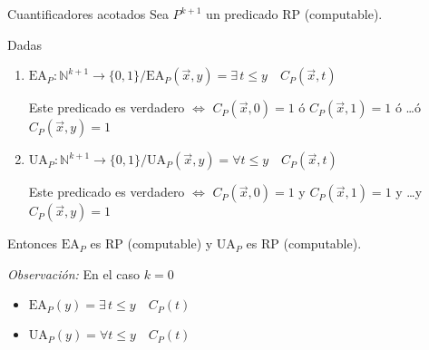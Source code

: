 \begin{teorema}{Cuantificadores acotados}{}
    Sea ${P}^{k+1}$ un predicado RP (computable).

    Dadas
    \begin{enumerate}
        \item {}%
            $\mathrm{EA}_P : \mathbb{N}^{k+1} \to \{0,1\} / 
            \mathrm{EA}_P (\overrightarrow{x},y) = \exists \, t \leq y
            \quad C_P (\overrightarrow{x},t)$

            Este predicado es verdadero $\iff$
            $C_P(\overrightarrow{x},0) = 1$ ó 
            $C_P(\overrightarrow{x},1) = 1$ ó 
            \dots ó
            $C_P(\overrightarrow{x},y) = 1$
        \item {}%
            $\mathrm{UA}_P : \mathbb{N}^{k+1} \to \{ 0,1 \} /
            \mathrm{UA}_P (\overrightarrow{x},y) = \forall t \leq y \quad
            C_P(\overrightarrow{x},t)$

            Este predicado es verdadero $\iff$
            $C_P(\overrightarrow{x},0) = 1$ y 
            $C_P(\overrightarrow{x},1) = 1$ y 
            \dots y
            $C_P(\overrightarrow{x},y) = 1$
    \end{enumerate}

    \medskip

    Entonces $\mathrm{EA}_P$ es RP (computable) y $\mathrm{UA}_P$ es RP
    (computable).

    \bigskip
    \textit{Observación:}
    En el caso $k=0$
    \begin{itemize}
        \item $\mathrm{EA}_P (y) = \exists \, t \leq y \quad C_P(t)$
        \item $\mathrm{UA}_P (y) = \forall t \leq y \quad C_P(t)$
    \end{itemize}
\end{teorema}

